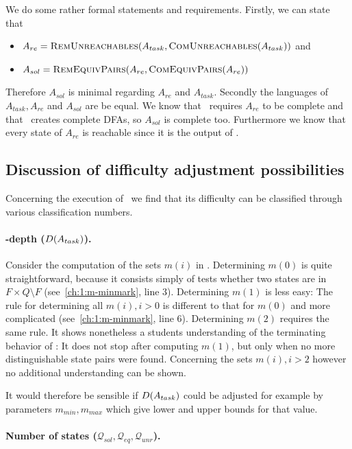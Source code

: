 We do some rather formal statements and requirements. Firstly, we can state that
\begin{itemize}
	\item $A_{re} = \textsc{RemUnreachables}(A_{task}, \textsc{ComUnreachables}(A_{task}))$ and
	\item $A_{sol} = \textsc{RemEquivPairs}(A_{re}, \textsc{ComEquivPairs}(A_{re}))$
\end{itemize}
Therefore $A_{sol}$ is minimal regarding $A_{re}$ and $A_{task}$. Secondly the languages of $A_{task}, A_{re}$ and $A_{sol}$ are be equal. We know that \CompDist\ requires $A_{re}$ to be complete and that \RemEq\ creates complete DFAs, so $A_{sol}$ is complete too. Furthermore we know that every state of $A_{re}$ is reachable since it is the output of \RemUnr.

\subsection{Discussion of difficulty adjustment possibilities}\label{ch:1:requirements-analysis}

Concerning the execution of \MinAlg\ we find that its difficulty can be classified through various classification numbers.

\paragraph*{\CompDist-depth ($D(A_{task})$).}

Consider the computation of the sets $m(i)$ in \CompDist. Determining $m(0)$ is quite straightforward, because it consists simply of tests whether two states are in $F \times Q \setminus F$ (see~\ref{ch:1:m-minmark}, line 3). Determining $m(1)$ is less easy: The rule for determining all $m(i), i > 0$ is different to that for $m(0)$ and more complicated (see~\ref{ch:1:m-minmark}, line 6). Determining $m(2)$ requires the same rule. It shows nonetheless a students understanding of the terminating behavior of \CompDist: It does not stop after computing $m(1)$, but only when no more distinguishable state pairs were found. Concerning the sets $m(i), i > 2$ however no additional understanding can be shown.

It would therefore be sensible if $D(A_{task})$ could be adjusted for example by parameters $m_{min}, m_{max}$ which give lower and upper bounds for that value.

\paragraph*{Number of states ($\mathcal{Q}_{sol}, \mathcal{Q}_{eq}, \mathcal{Q}_{unr}$).}

